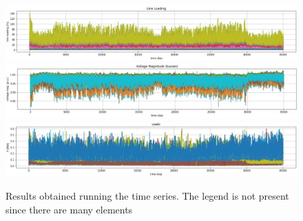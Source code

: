 \begin{figure}[h]
\centering
    \includegraphics[width=.9\linewidth]{images/MVOberr/ll.PNG}
    \includegraphics[width=.9\linewidth]{images/MVOberr/vm.PNG}
    \includegraphics[width=.9\linewidth]{images/MVOberr/l.png}
\caption{Results obtained running the time series. The legend is not present since there are many elements}
\label{fig:gym_anm_net}
\end{figure}

